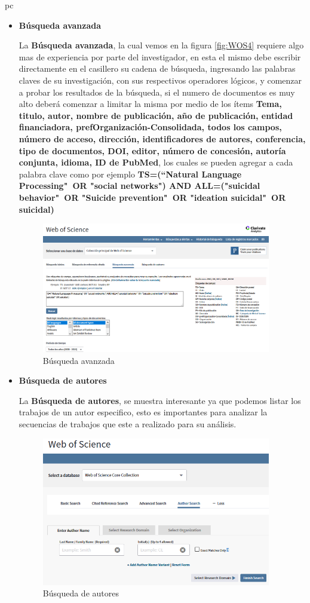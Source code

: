 pc\documentclass[a4paper,12pt,openany]{book}
\begin{document}
\begin{itemize}
\begin{itemize}
\item \textbf{Búsqueda avanzada}

La \textbf{Búsqueda avanzada}, la cual vemos en la figura \ref{fig:WOS4} requiere algo mas de experiencia por parte del investigador, en esta el mismo debe escribir directamente en el casillero su cadena de búsqueda, ingresando las palabras claves de su investigación, con sus respectivos operadores lógicos, y comenzar a probar los resultados de la búsqueda, si el numero de documentos es muy alto deberá comenzar a limitar la misma por medio de los ítems \textbf{Tema, titulo, autor, nombre de publicación, año de publicación, entidad financiadora, prefOrganización-Consolidada, todos los campos, número de acceso, dirección, identificadores de autores, conferencia, tipo de documentos, DOI, editor, número de concesión, autoría conjunta, idioma, ID de PubMed}, los cuales se pueden agregar a cada palabra clave como por ejemplo \textbf{TS=(``Natural Language Processing"\   OR "social networks") AND ALL=("suicidal behavior"\ OR "Suicide prevention"\ OR "ideation suicidal"\ OR suicidal)}

    \begin{figure}[H]
    \centering
    \includegraphics[width=10cm]{Wos5.png}
    \caption{Búsqueda avanzada}
    \label{fig:WOS5}
    \end{figure}

\item \textbf{Búsqueda de autores}

La \textbf{Búsqueda de autores}, se muestra interesante ya que podemos listar los trabajos de un autor especifico, esto es importantes para analizar la secuencias de trabajos que este a realizado para su análisis. 

    \begin{figure}[H]
    \centering
    \includegraphics[width=10cm]{Wos6.png}
    \caption{Búsqueda de autores}
    \label{fig:WOS6}
    \end{figure}
\end{itemize}


\end{itemize}
\end{document}
